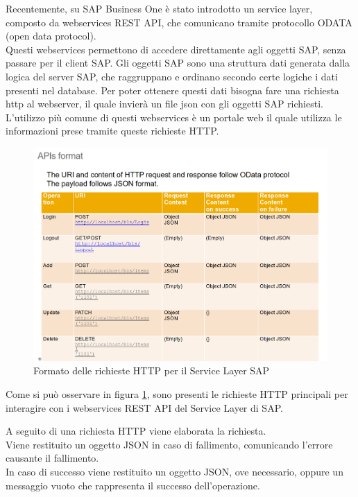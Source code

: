	Recentemente, su SAP Business One è stato introdotto un service layer, composto da webservices REST API, che comunicano tramite protocollo ODATA (open data protocol).\\
	Questi webservices permettono di accedere direttamente agli oggetti SAP, senza passare per il client SAP. Gli oggetti SAP sono una struttura dati generata dalla logica del server SAP, che raggruppano e ordinano secondo certe logiche i dati presenti nel database. Per poter ottenere questi dati bisogna fare una richiesta http al webserver, il quale invierà un file json con gli oggetti SAP richiesti.\\L'utilizzo più comune di questi webservices è un portale web il quale utilizza le informazioni prese tramite queste richieste HTTP. 

\begin{figure}[!h] 
	\centering 
	\includegraphics[scale = 0.37]{immagini/api_Format.png} 
	\caption {Formato delle richieste HTTP per il Service Layer SAP}
	\label{fig:2-11}
\end{figure}

	\item Come si può osservare in figura \ref{fig:2-11}, sono presenti le richieste HTTP principali per interagire con i webservices REST API del Service Layer di SAP.
	\item A seguito di una richiesta HTTP viene elaborata la richiesta.\\Viene restituito un oggetto JSON in caso di fallimento, comunicando l'errore causante il fallimento.\\In caso di successo viene restituito un oggetto JSON, ove necessario, oppure un messaggio vuoto che rappresenta il successo dell'operazione.


